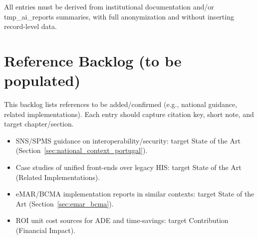 All entries must be derived from institutional documentation and/or tmp\_ai\_reports summaries, with full anonymization and without inserting record-level data.

\section{Reference Backlog (to be populated)}
This backlog lists references to be added/confirmed (e.g., national guidance, related implementations). Each entry should capture citation key, short note, and target chapter/section.
\begin{itemize}
    \item SNS/SPMS guidance on interoperability/security: target State of the Art (Section~\ref{sec:national_context_portugal}).
    \item Case studies of unified front-ends over legacy HIS: target State of the Art (Related Implementations).
    \item eMAR/BCMA implementation reports in similar contexts: target State of the Art (Section~\ref{sec:emar_bcma}).
    \item ROI unit cost sources for ADE and time-savings: target Contribution (Financial Impact).
\end{itemize}